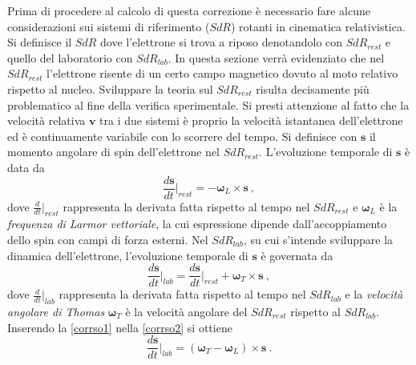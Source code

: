 \documentclass[12pt,a4paper]{report}
\numberwithin{equation}{section}
\numberwithin{section}{chapter}
\begin{document}
	Prima di procedere al calcolo di questa correzione \`e necessario fare alcune considerazioni sui sistemi di riferimento ($SdR$) rotanti in cinematica relativistica. Si definisce il $SdR$ dove l'elettrone si trova a riposo denotandolo con $SdR_{rest}$ e quello del laboratorio con $SdR_{lab}$. In questa sezione verr\`a evidenziato che nel $SdR_{rest}$ l'elettrone risente di un certo campo magnetico dovuto al moto relativo rispetto al nucleo. Sviluppare la teoria sul $SdR_{rest}$ risulta decisamente pi\`u problematico al fine della verifica sperimentale. Si presti attenzione al fatto che la velocit\`a relativa $\boldsymbol{v}$ tra i due sistemi \`e proprio la velocit\`a istantanea dell'elettrone ed \`e continuamente variabile con lo scorrere del tempo.
	Si definisce con $\boldsymbol{s}$ il momento angolare di spin dell'elettrone nel $SdR_{rest}$. L'evoluzione temporale di $\boldsymbol{s}$ \`e data da
	\begin{equation}
	\label{corrso1}
	\frac{d\boldsymbol{s}}{dt}\bigg\vert_{rest} = -\boldsymbol{\omega}_L \times \boldsymbol{s}~,
	\end{equation}
	dove $\frac{d}{dt}\big\vert_{rest}$ rappresenta la derivata fatta rispetto al tempo nel $SdR_{rest}$ e $\boldsymbol{\omega}_L$ \`e la \textit{frequenza di Larmor vettoriale}, la cui espressione dipende dall'accoppiamento dello spin con campi di forza esterni. Nel $SdR_{lab}$, su cui s'intende sviluppare la dinamica dell'elettrone, l'evoluzione temporale di $\boldsymbol{s}$ \`e governata da
	\begin{equation}
	\label{corrso2}
	\frac{d\boldsymbol{s}}{dt}\bigg\vert_{lab} = \frac{d\boldsymbol{s}}{dt}\bigg\vert_{rest} +\boldsymbol{\omega}_T \times \boldsymbol{s}~,
	\end{equation}
	dove $\frac{d}{dt}\big\vert_{lab}$ rappresenta la derivata fatta rispetto al tempo nel $SdR_{lab}$ e la \textit{velocit\`a angolare di Thomas} $\boldsymbol{\omega}_T$ \`e la velocit\`a angolare del $SdR_{rest}$ rispetto al $SdR_{lab}$. Inserendo la \eqref{corrso1} nella \eqref{corrso2} si ottiene
	\begin{equation}
	\label{corrso3}
	\frac{d\boldsymbol{s}}{dt}\bigg\vert_{lab} = (\boldsymbol{\omega}_T-\boldsymbol{\omega}_L) \times \boldsymbol{s}~.
	\end{equation}
	
\end{document}
